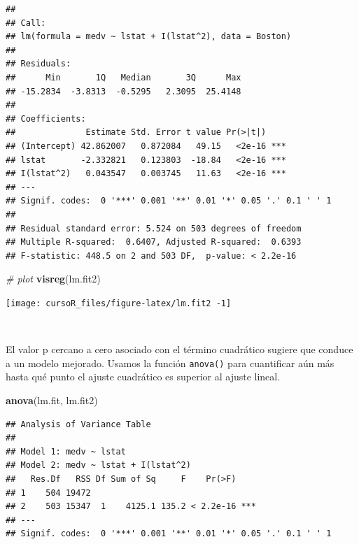 \documentclass[]{book}
\newenvironment{Shaded}{\begin{snugshade}}{\end{snugshade}}
\newcommand{\KeywordTok}[1]{\textcolor[rgb]{0.13,0.29,0.53}{\textbf{#1}}}
\newcommand{\CommentTok}[1]{\textcolor[rgb]{0.56,0.35,0.01}{\textit{#1}}}
\newcommand{\NormalTok}[1]{#1}
\begin{document}
\begin{verbatim}
## 
## Call:
## lm(formula = medv ~ lstat + I(lstat^2), data = Boston)
## 
## Residuals:
##      Min       1Q   Median       3Q      Max 
## -15.2834  -3.8313  -0.5295   2.3095  25.4148 
## 
## Coefficients:
##              Estimate Std. Error t value Pr(>|t|)    
## (Intercept) 42.862007   0.872084   49.15   <2e-16 ***
## lstat       -2.332821   0.123803  -18.84   <2e-16 ***
## I(lstat^2)   0.043547   0.003745   11.63   <2e-16 ***
## ---
## Signif. codes:  0 '***' 0.001 '**' 0.01 '*' 0.05 '.' 0.1 ' ' 1
## 
## Residual standard error: 5.524 on 503 degrees of freedom
## Multiple R-squared:  0.6407, Adjusted R-squared:  0.6393 
## F-statistic: 448.5 on 2 and 503 DF,  p-value: < 2.2e-16
\end{verbatim}

\begin{Shaded}
\begin{Highlighting}[]
\CommentTok{# plot}
\KeywordTok{visreg}\NormalTok{(lm.fit2)}
\end{Highlighting}
\end{Shaded}

\begin{center}\texttt{[image: cursoR\_files/figure-latex/lm.fit2 -1]} \end{center}

~

El valor p cercano a cero asociado con el término cuadrático sugiere que
conduce a un modelo mejorado. Usamos la función \texttt{anova()} para
cuantificar aún más hasta qué punto el ajuste cuadrático es superior al
ajuste lineal.

\begin{Shaded}
\begin{Highlighting}[]
\KeywordTok{anova}\NormalTok{(lm.fit, lm.fit2)}
\end{Highlighting}
\end{Shaded}

\begin{verbatim}
## Analysis of Variance Table
## 
## Model 1: medv ~ lstat
## Model 2: medv ~ lstat + I(lstat^2)
##   Res.Df   RSS Df Sum of Sq     F    Pr(>F)    
## 1    504 19472                                 
## 2    503 15347  1    4125.1 135.2 < 2.2e-16 ***
## ---
## Signif. codes:  0 '***' 0.001 '**' 0.01 '*' 0.05 '.' 0.1 ' ' 1
\end{verbatim}

~
\end{document}
